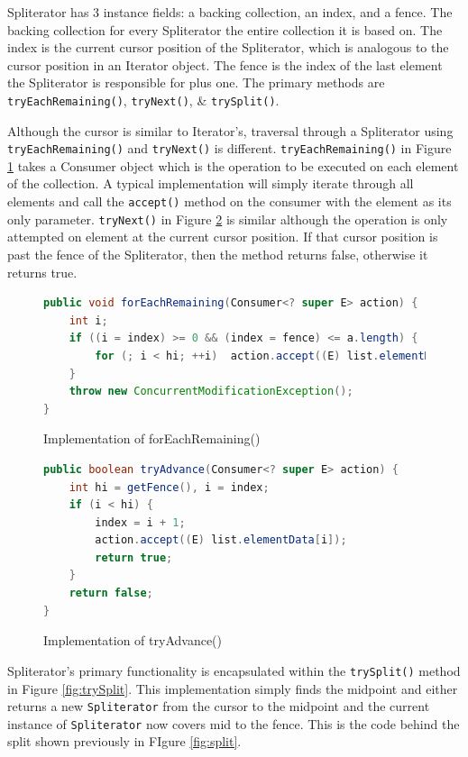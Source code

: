 \documentclass[oneside, a4paper, 11pt]{article}
\begin{document}
Spliterator has 3 instance fields: a backing collection, an index, and a fence. The backing collection for every Spliterator the entire collection it is based on. The index is the current cursor position of the Spliterator, which is analogous to the cursor position in an Iterator object. The fence is the index of the last element the Spliterator is responsible for plus one. The primary methods are \verb|tryEachRemaining()|, \verb|tryNext()|, \& \verb|trySplit()|. 

Although the cursor is similar to Iterator's, traversal through a Spliterator using \verb|tryEachRemaining()| and \verb|tryNext()| is different. \verb|tryEachRemaining()| in Figure \ref{fig:forEachRemaining} takes a Consumer object which is the operation to be executed on each element of the collection. A typical implementation will simply iterate through all elements and call the \verb|accept()| method on the consumer with the element as its only parameter. \verb|tryNext()| in Figure \ref{fig:tryAdvance} is similar although the operation is only attempted on element at the current cursor position. If that cursor position is past the fence of the Spliterator, then the method returns false, otherwise it returns true.

\begin{figure}[H]
\begin{lstlisting}[language=Java]
public void forEachRemaining(Consumer<? super E> action) {
    int i;
    if ((i = index) >= 0 && (index = fence) <= a.length) {
        for (; i < hi; ++i)  action.accept((E) list.elementData[i]);
    }
    throw new ConcurrentModificationException();
}
\end{lstlisting}
\caption{Implementation of forEachRemaining()}
\label{fig:forEachRemaining}
\end{figure}

\begin{figure}[H]
\begin{lstlisting}[language=Java]
public boolean tryAdvance(Consumer<? super E> action) {
    int hi = getFence(), i = index;
    if (i < hi) {
        index = i + 1;
        action.accept((E) list.elementData[i]);
        return true;
    }
    return false;
}
\end{lstlisting}
\caption{Implementation of tryAdvance()}
\label{fig:tryAdvance}
\end{figure}

Spliterator's primary functionality is encapsulated within the \verb|trySplit()| method in Figure \ref{fig:trySplit}. This implementation simply finds the midpoint and either returns a new \verb|Spliterator| from the cursor to the midpoint and the current instance of \verb|Spliterator| now covers mid to the fence. This is the code behind the split shown previously in FIgure \ref{fig:split}.
\end{document}

